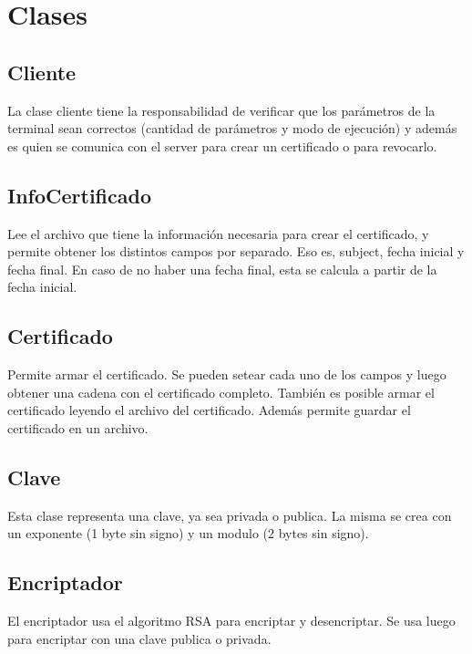 \documentclass[titlepage,a4paper]{article}
\begin{document}
\lstset{language=C} 
\newpage

\section{Clases}

\subsection{Cliente}

La clase cliente tiene la responsabilidad de verificar que los parámetros de la terminal sean correctos (cantidad de parámetros y modo de ejecución) y además es quien se comunica con el server para crear un certificado o para revocarlo.

\subsection{InfoCertificado}

Lee el archivo que tiene la información necesaria para crear el certificado, y permite obtener los distintos campos por separado. Eso es, subject, fecha inicial y fecha final. En caso de no haber una fecha final, esta se calcula a partir de la fecha inicial.

\subsection{Certificado}

Permite armar el certificado. Se pueden setear cada uno de los campos y luego obtener una cadena con el certificado completo. También es posible armar el certificado leyendo el archivo del certificado. Además permite guardar el certificado en un archivo.

\subsection{Clave}

Esta clase representa una clave, ya sea privada o publica. La misma se crea con un exponente (1 byte sin signo) y un modulo (2 bytes sin signo).

\subsection{Encriptador}

El encriptador usa el algoritmo RSA para encriptar y desencriptar. Se usa luego para encriptar con una clave publica o privada.
\end{document}
